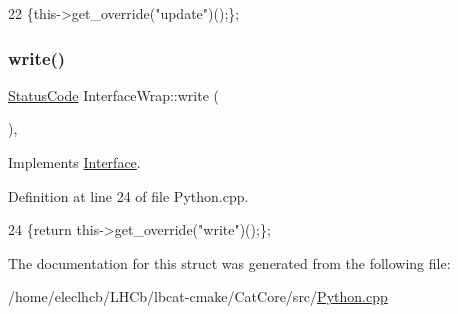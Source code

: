 \begin{DoxyCode}
22 \{this->get\_override(\textcolor{stringliteral}{"update"})();\};
\end{DoxyCode}
\mbox{\label{structInterfaceWrap_afbf6658c8be109e72f38d61438ec94d3}} 
\subsubsection{\texorpdfstring{write()}{write()}}
{\footnotesize\ttfamily \hyperlink{classStatusCode}{Status\+Code} Interface\+Wrap\+::write (\begin{DoxyParamCaption}\item[{\hyperlink{classIOdata}{I\+Odata} $\ast$}]{ }\end{DoxyParamCaption})\hspace{0.3cm}{\ttfamily [inline]}, {\ttfamily [virtual]}}



Implements \hyperlink{classInterface_ad665cacbaf490a26c1c4ba192022e68a}{Interface}.



Definition at line 24 of file Python.\+cpp.


\begin{DoxyCode}
24 \{\textcolor{keywordflow}{return} this->get\_override(\textcolor{stringliteral}{"write"})();\};
\end{DoxyCode}


The documentation for this struct was generated from the following file\+:\begin{DoxyCompactItemize}
\item 
/home/eleclhcb/\+L\+H\+Cb/lbcat-\/cmake/\+Cat\+Core/src/\hyperlink{CatCore_2src_2Python_8cpp}{Python.\+cpp}\end{DoxyCompactItemize}
